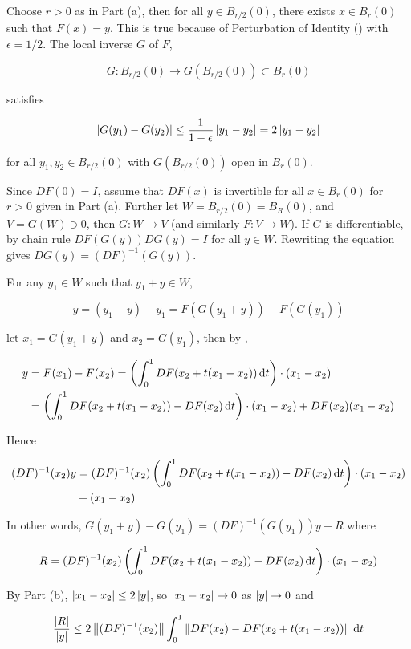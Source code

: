 \documentclass[a4paper,12pt]{article}
\begin{document}
\begin{thm}
   Choose $r>0$ as in Part (a), then for all $y\in B_{r/2}(0)$, there exists $x\in B_{r}(0)$ such that $F(x)=y$. This is true because of Perturbation of Identity (\rthm[\sctr{6}]) with $\epsilon=1/2$. The local inverse $G$ of $F$,

  $$G:B_{r/2}(0)\to G(B_{r/2}(0))\subset B_{r}(0)$$\s

  satisfies

  $$\left| G(y_{1})-G(y_{2})\right|\leq\frac{1}{1-\epsilon}\left| y_{1}-y_{2}\right|=2\left| y_{1}-y_{2}\right|$$\s

  for all $y_{1},y_{2}\in B_{r/2}(0)$ with $G(B_{r/2}(0))$ open in $B_{r}(0)$.\n

   Since $DF(0)=I$, assume that $DF(x)$ is invertible for all $x\in B_{r}(0)$ for $r>0$ given in Part (a). Further let $W=B_{r/2}(0)=B_{R}(0)$, and $V=G(W)\ni 0$, then $G:W\to V$ (and similarly $F:V\to W$). If $G$ is differentiable, by chain rule $DF(G(y))DG(y)=I$ for all $y\in W$. Rewriting the equation gives $DG(y)=(DF)^{-1}(G(y))$.\n

  For any $y_{1}\in W$ such that $y_{1}+y\in W$,

  $$y=(y_{1}+y)-y_{1}=F(G(y_{1}+y))-F(G(y_{1}))$$\s

  let $x_{1}=G(y_{1}+y)$ and $x_{2}=G(y_{1})$, then by \rpst[\sctr{3}],

  $$\begin{aligned}[t]
    y&=F(x_{1})-F(x_{2})=\left( \int_{0}^{1}DF(x_{2}+t(x_{1}-x_{2}))\,\mathrm{d} t\right)\cdot(x_{1}-x_{2})\\
    &=\left( \int_{0}^{1}DF(x_{2}+t(x_{1}-x_{2}))-DF(x_{2})\,\mathrm{d} t\right)\cdot(x_{1}-x_{2})+DF(x_{2})(x_{1}-x_{2})
  \end{aligned}$$\s

  Hence

  $$\begin{aligned}[t]
    (DF)^{-1}(x_{2})y&=(DF)^{-1}(x_{2})\left( \int_{0}^{1}DF(x_{2}+t(x_{1}-x_{2}))-DF(x_{2})\,\mathrm{d} t\right)\cdot(x_{1}-x_{2})\\
    &+(x_{1}-x_{2})
  \end{aligned}$$\s

  In other words, $G(y_{1}+y)-G(y_{1})=(DF)^{-1}(G(y_{1}))y+R$ where

  $$R=(DF)^{-1}(x_{2})\left( \int_{0}^{1}DF(x_{2}+t(x_{1}-x_{2}))-DF(x_{2})\,\mathrm{d} t\right)\cdot(x_{1}-x_{2})$$\s

  By Part (b), $\left| x_{1}-x_{2}\right|\leq 2\left| y\right|$, so $\left| x_{1}-x_{2}\right|\to 0$ as $\left| y\right|\to 0$ and

  $$\frac{\left| R\right|}{\left| y\right|}\leq 2\left\| (DF)^{-1}(x_{2})\right\|\int_{0}^{1}\left\| DF(x_{2})-DF(x_{2}+t(x_{1}-x_{2}))\right\|\,\mathrm{d} t$$\s


\end{thm}
\end{document}
